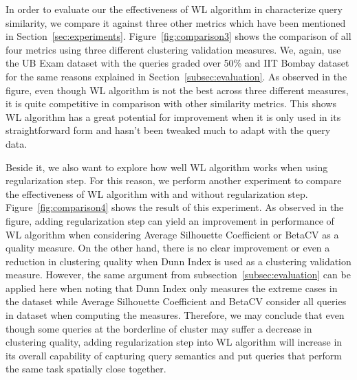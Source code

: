 In order to evaluate our the effectiveness of WL algorithm in characterize query similarity, we compare it against three other metrics which have been mentioned in Section~\ref{sec:experiments}. Figure~\ref{fig:comparison3} shows the comparison of all four metrics using three different clustering validation measures. We, again, use the UB Exam dataset with the queries graded over 50\% and IIT Bombay dataset for the same reasons explained in Section~\ref{subsec:evaluation}. As observed in the figure, even though WL algorithm is not the best across three different measures, it is quite competitive in comparison with other similarity metrics. This shows WL algorithm has a great potential for improvement when it is only used in its straightforward form and hasn't been tweaked much to adapt with the query data. 

Beside it, we also want to explore how well WL algorithm works when using regularization step. For this reason, we perform another experiment to compare the effectiveness of WL algorithm with and without regularization step. Figure~\ref{fig:comparison4} shows the result of this experiment. As observed in the figure, adding regularization step can yield an improvement in performance of WL algorithm when considering Average Silhouette Coefficient or BetaCV as a quality measure. On the other hand, there is no clear improvement or even a reduction in clustering quality when Dunn Index is used as a clustering validation measure. However, the same argument from subsection~\ref{subsec:evaluation} can be applied here when noting that Dunn Index only measures the extreme cases in the dataset while Average Silhouette Coefficient and BetaCV consider all queries in dataset when computing the measures. Therefore, we may conclude that even though some queries at the borderline of cluster may suffer a decrease in clustering quality, adding regularization step into WL algorithm will increase in its overall capability of capturing query semantics and put queries that perform the same task spatially close together.

